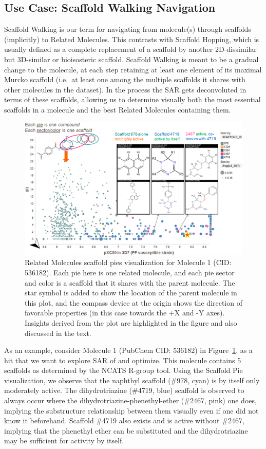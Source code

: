 \documentclass[journal=jacsat,manuscript=article]{achemso}
\newcommand*\fref[1]{Figure~\ref{fig:#1}}
\newcommand*\ie{i.e.~}
\begin{document}
\subsection{Use Case: Scaffold Walking Navigation}
\label{sec:scafwalk}
Scaffold Walking is our term for navigating from molecule(s) through scaffolds (implicitly) to Related Molecules. This contrasts with Scaffold Hopping, which is usually defined as a complete replacement of a scaffold by another 2D-dissimilar but 3D-similar or bioisosteric scaffold. Scaffold Walking is meant to be a gradual change to the molecule, at each step retaining at least one element of its maximal Murcko scaffold (\ie at least one among the multiple scaffolds it shares with other molecules in the dataset).  In the process the SAR gets deconvoluted in terms of these scaffolds, allowing us to determine visually both the most essential scaffolds in a molecule and the best Related Molecules containing them.       
\begin{figure}
\includegraphics[width=6in]{fig/mol1_RGtool_scafpie.png}
\caption{Related Molecules scaffold pies visualization for Molecule 1 (CID: 536182). Each pie here is one related molecule, and each pie sector and color is a scaffold that it shares with the parent molecule. The star symbol is added to show the location of the parent molecule in this plot, and the compass device at the origin shows the direction of favorable properties (in this case towards the +X and -Y axes). Insights derived from the plot are highlighted in the figure and also discussed in the text.}
\label{fig:scafwalk1}
\end{figure}

As an example, consider Molecule 1 (PubChem CID: 536182) in \fref{scafwalk1}, as a hit that we want to explore SAR of and optimize. This molecule contains 5 scaffolds as determined by the NCATS R-group tool. Using the Scaffold Pie visualization, we observe that the naphthyl scaffold (\#978, cyan) is by itself only moderately active.  The dihydrotriazine (\#4719, blue) scaffold is observed to always occur where the dihydrotriazine-phenethyl-ether (\#2467, pink) one does, implying the substructure relationship between them visually even if one did not know it beforehand. Scaffold \#4719 also exists and is active without \#2467, implying that the phenethyl ether can be substituted and the dihydrotriazine may be sufficient for activity by itself.
\end{document}
